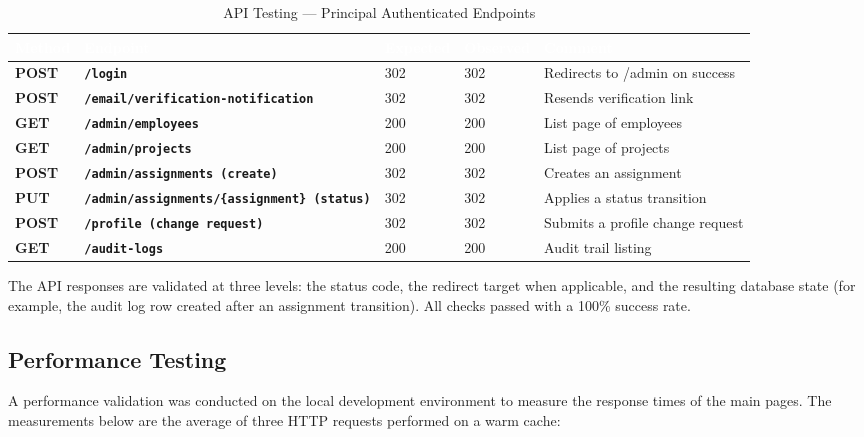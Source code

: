 \documentclass{bts-report}
\begin{document}
\begin{table}[H]
  \centering
  \caption{API Testing --- Principal Authenticated Endpoints}
  \vspace{0.2cm}
  \begin{tabularx}{\textwidth}{|>{\bfseries}p{1.2cm}|>{\bfseries}p{5.0cm}|p{2.0cm}|p{2.0cm}|X|}
    \hline
    \rowcolor{tableheader}
    \textcolor{white}{\textbf{Method}} & \textcolor{white}{\textbf{Endpoint}} & \textcolor{white}{\textbf{Expected}} & \textcolor{white}{\textbf{Observed}} & \textcolor{white}{\textbf{Comment}} \\
    \hline
    POST & \texttt{/login} & 302 & 302 & Redirects to /admin on success \\
    \hline
    POST & \texttt{/email/verification-notification} & 302 & 302 & Resends verification link \\
    \hline
    GET & \texttt{/admin/employees} & 200 & 200 & List page of employees \\
    \hline
    GET & \texttt{/admin/projects} & 200 & 200 & List page of projects \\
    \hline
    POST & \texttt{/admin/assignments (create)} & 302 & 302 & Creates an assignment \\
    \hline
    PUT & \texttt{/admin/assignments/\{assignment\} (status)} & 302 & 302 & Applies a status transition \\
    \hline
    POST & \texttt{/profile (change request)} & 302 & 302 & Submits a profile change request \\
    \hline
    GET & \texttt{/audit-logs} & 200 & 200 & Audit trail listing \\
    \hline
  \end{tabularx}
\end{table}

The API responses are validated at three levels: the status code, the redirect target when applicable, and the resulting database state (for example, the audit log row created after an assignment transition). All checks passed with a 100\% success rate.

\subsection{Performance Testing}
A performance validation was conducted on the local development environment to measure the response times of the main pages. The measurements below are the average of three HTTP requests performed on a warm cache:
\end{document}
